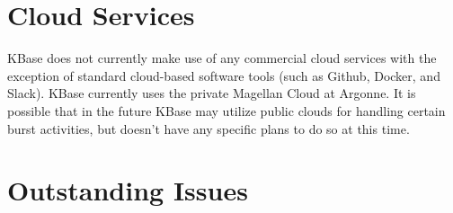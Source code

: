 \documentclass[10pt,a4paper]{report}
\begin{document}
\section{Cloud Services}

KBase does not currently make use of any commercial cloud services with the exception of standard cloud-based software tools (such as Github, Docker, and Slack).  KBase currently uses the private Magellan Cloud at Argonne.  It is possible that in the future KBase may utilize public clouds for handling certain burst activities, but doesn't have any specific plans to do so at this time.

\section{Outstanding Issues}
\end{document}
